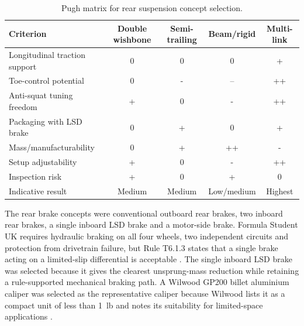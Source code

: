 \begin{table}[H]
\centering
\caption{Pugh matrix for rear suspension concept selection.}
\label{tab:pugh_susp_wheel}
\setlength{\tabcolsep}{3pt}
\begin{tabularx}{\linewidth}{|>{\raggedright\arraybackslash}X|c|c|c|c|}
\hline
\textbf{Criterion} & \textbf{Double wishbone} & \textbf{Semi-trailing} & \textbf{Beam/rigid} & \textbf{Multi-link} \\
\hline
Longitudinal traction support & 0 & 0 & 0 & + \\
\hline
Toe-control potential & 0 & - & -- & ++ \\
\hline
Anti-squat tuning freedom & + & 0 & - & ++ \\
\hline
Packaging with LSD brake & 0 & + & 0 & + \\
\hline
Mass/manufacturability & 0 & + & ++ & - \\
\hline
Setup adjustability & + & 0 & - & ++ \\
\hline
Inspection risk & + & 0 & + & 0 \\
\hline
Indicative result & Medium & Medium & Low/medium & Highest \\
\hline
\end{tabularx}
\end{table}

The rear brake concepts were conventional outboard rear brakes, two inboard rear brakes, a single inboard LSD brake and a motor-side brake. Formula Student UK requires hydraulic braking on all four wheels, two independent circuits and protection from drivetrain failure, but Rule T6.1.3 states that a single brake acting on a limited-slip differential is acceptable \parencite{zxFSUK2026Rules}. The single inboard LSD brake was selected because it gives the clearest unsprung-mass reduction while retaining a rule-supported mechanical braking path. A Wilwood GP200 billet aluminium caliper was selected as the representative caliper because Wilwood lists it as a compact unit of less than \SI{1}{lb} and notes its suitability for limited-space applications \parencite{zxWilwoodGP200}.

